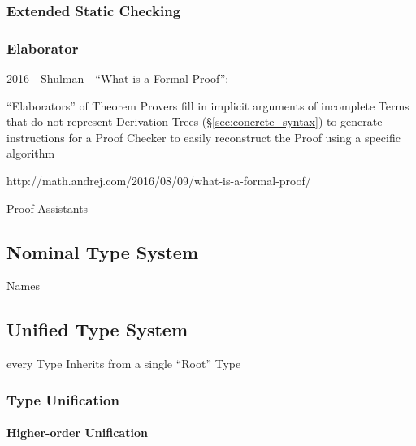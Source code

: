 \subsubsection{Extended Static Checking}\label{sec:extended_static}

\subsubsection{Elaborator}\label{sec:elaborator}

2016 - Shulman - ``What is a Formal Proof'': %

``Elaborators'' of Theorem Provers fill in implicit arguments of
incomplete Terms that do not represent Derivation Trees
(\S\ref{sec:concrete_syntax}) to generate instructions for a Proof
Checker to easily reconstruct the Proof using a specific algorithm

http://math.andrej.com/2016/08/09/what-is-a-formal-proof/ %

Proof Assistants %



\subsection{Nominal Type System}\label{sec:nominal_type_system}

Names



\subsection{Unified Type System}\label{sec:unified_type_system}

every Type Inherits from a single ``Root'' Type



\subsubsection{Type Unification}\label{sec:type_unification}




\paragraph{Higher-order Unification}
\label{sec:higherorder_unification}

